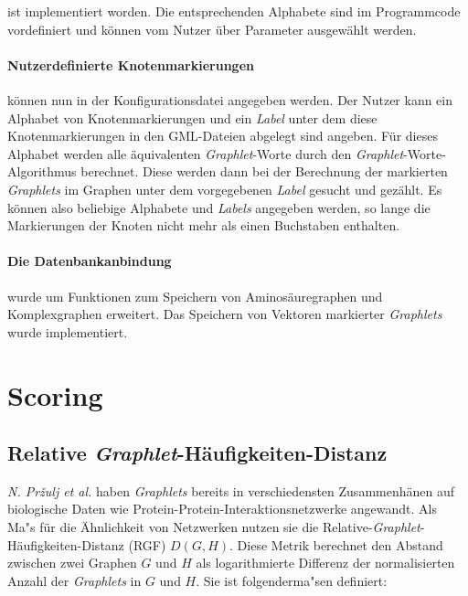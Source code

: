 \documentclass{report}
\begin{document}
ist implementiert worden. Die entsprechenden Alphabete sind im Programmcode vordefiniert und k\"onnen vom Nutzer \"uber Parameter ausgew\"ahlt werden.

\paragraph{Nutzerdefinierte Knotenmarkierungen} k\"onnen nun in der Konfigurationsdatei angegeben werden. Der Nutzer kann ein Alphabet von Knotenmarkierungen und ein \textit{Label} unter dem diese Knotenmarkierungen in den GML-Dateien abgelegt sind angeben. F\"ur dieses Alphabet werden alle \"aquivalenten \textit{Graphlet}-Worte durch den \textit{Graphlet}-Worte-Algorithmus berechnet. Diese werden dann bei der Berechnung der markierten \textit{Graphlets} im Graphen unter dem vorgegebenen \textit{Label} gesucht und gez\"ahlt.
Es k\"onnen also beliebige Alphabete und \textit{Labels} angegeben werden, so lange die Markierungen der Knoten nicht mehr als einen Buchstaben enthalten. 
 

\paragraph{Die Datenbankanbindung} wurde um Funktionen zum Speichern von Aminos\"auregraphen und Komplexgraphen erweitert. Das Speichern von Vektoren markierter \textit{Graphlets} wurde implementiert.



\section{Scoring}





\subsection{Relative \textit{Graphlet}-H\"aufigkeiten-Distanz}

\textit{N. Pr\v{z}ulj et al.} haben \textit{Graphlets} bereits in verschiedensten Zusammenh\"anen auf biologische Daten wie Protein-Protein-Interaktionsnetzwerke \cite{frqdistribution} angewandt. Als Ma"s f\"ur die \"Ahnlichkeit von Netzwerken nutzen sie die Relative-\textit{Graphlet}-H\"aufigkeiten-Distanz (RGF) $D(G,H)$. Diese Metrik berechnet den Abstand zwischen zwei Graphen $G$ und $H$ als logarithmierte Differenz der normalisierten Anzahl der \textit{Graphlets} in $G$ und $H$. Sie ist folgenderma"sen definiert: \\
\end{document}
